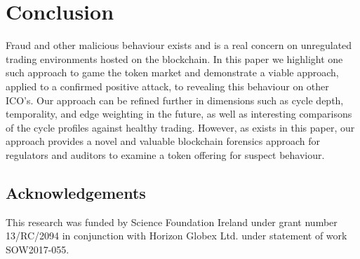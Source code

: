 \documentclass[conference]{IEEEtran}
\begin{document}
\section{Conclusion}
Fraud and other malicious behaviour exists and is a real concern on unregulated trading environments hosted on the blockchain.  In this paper we highlight one such approach to game the token market and demonstrate a viable approach, applied to a confirmed positive attack, to revealing this behaviour on other ICO's. Our approach can be refined further in dimensions such as cycle depth, temporality, and edge weighting in the future, as well as interesting comparisons of the cycle profiles against healthy trading. However, as exists in this paper, our approach provides a novel and valuable blockchain forensics approach for regulators and auditors to examine a token offering for suspect behaviour.

\subsection{Acknowledgements}
This research was funded by Science Foundation Ireland under grant number 13/RC/2094 in conjunction with Horizon Globex Ltd. under statement of work SOW2017-055.

\vspace{12pt}



\end{document}
